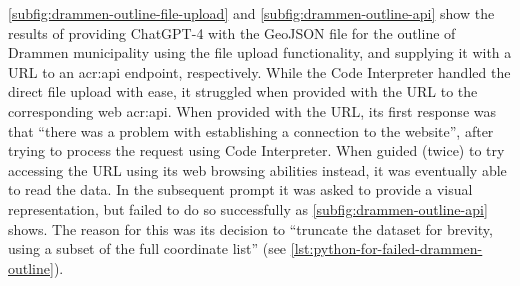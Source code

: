 \autoref{subfig:drammen-outline-file-upload} and \autoref{subfig:drammen-outline-api} show the results of providing ChatGPT-4 with the GeoJSON file for the outline of Drammen municipality using the file upload functionality, and supplying it with a URL to an \acrshort{acr:api} endpoint, respectively. While the Code Interpreter handled the direct file upload with ease, it struggled when provided with the URL to the corresponding web \acrshort{acr:api}. When provided with the URL, its first response was that \enquote{there was a problem with establishing a connection to the website}, after trying to process the request using Code Interpreter. When guided (twice) to try accessing the URL using its web browsing abilities instead, it was eventually able to read the data. In the subsequent prompt it was asked to provide a visual representation, but failed to do so successfully as \autoref{subfig:drammen-outline-api} shows. The reason for this was its decision to \enquote{truncate the dataset for brevity, using a subset of the full coordinate list} (see \autoref{lst:python-for-failed-drammen-outline}).

